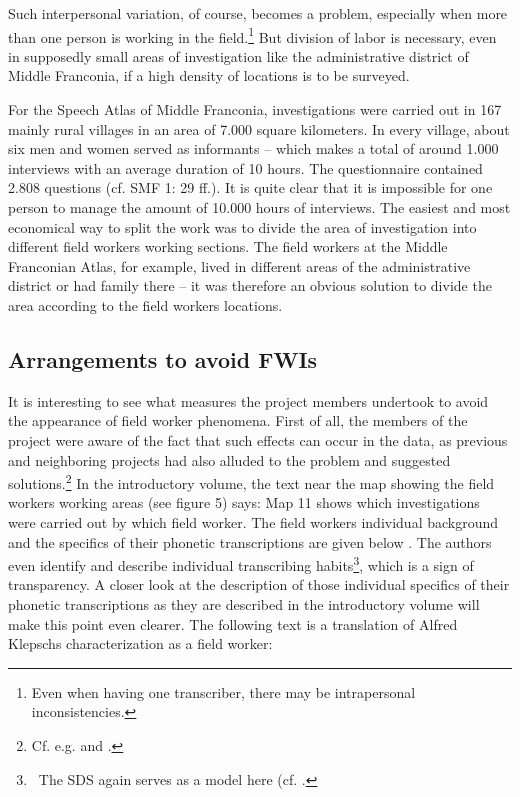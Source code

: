 \documentclass[output=paper]{LSP/langsci}
\begin{document}
Such interpersonal variation, of course, becomes a problem, especially when more than one person is working in the field.\footnote{Even when having one transcriber, there may be intrapersonal inconsistencies.} But division of labor is necessary, even in supposedly small areas of investigation like the administrative district of Middle Franconia, if a high density of locations is to be surveyed.

For the Speech Atlas of Middle Franconia, investigations were carried out in 167 mainly rural villages in an area of 7.000 square kilometers. In every village, about six men and women served as informants – which makes a total of around 1.000 interviews with an average duration of 10 hours. The questionnaire contained 2.808 questions (cf. SMF 1: 29 ff.). It is quite clear that it is impossible for one person to manage the amount of 10.000 hours of interviews. The easiest and most economical way to split the work was to divide the area of investigation into different field workers{\textquotesingle} working sections. The field workers at the Middle Franconian Atlas, for example, lived in different areas of the administrative district or had family there – it was therefore an obvious solution to divide the area according to the field workers{\textquotesingle} locations.

\subsection{Arrangements to avoid FWIs}
It is interesting to see what measures the project members undertook to avoid the appearance of field worker phenomena. First of all, the members of the project were aware of the fact that such effects can occur in the data, as previous and neighboring projects had also alluded to the problem and suggested solutions.\footnote{Cf. e.g. \citet[59]{hotzenkocherle_einfuhrung_1962} and \citet[45]{konig_sprachatlas_1997}.} In the introductory volume, the text near the map showing the field workers{\textquotesingle} working areas (see figure 5) says: {\textquotedbl}Map 11 shows which investigations were carried out by which field worker. The field workers{\textquotesingle} individual background and the specifics of their phonetic transcriptions are given below{\textquotedbl} \citep[47]{klepsch_sprachatlas_2013}. The authors even identify and describe individual transcribing habits\footnote{\ The SDS again serves as a model here (cf. \cite[61--73]{hotzenkocherle_einfuhrung_1962}.}, which is a sign of transparency. A closer look at the description of those individual {\textquotedbl}specifics of their phonetic transcriptions{\textquotedbl} as they are described in the introductory volume will make this point even clearer. The following text is a translation of Alfred Klepsch{\textquotesingle}s characterization as a field worker:
\end{document}
